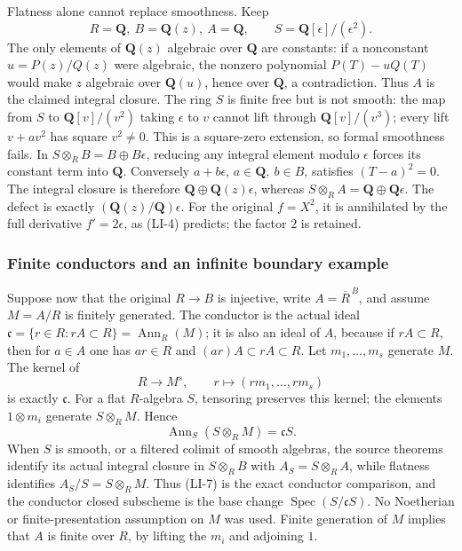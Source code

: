 Flatness alone cannot replace smoothness. Keep \[
R=\mathbf Q,\ B=\mathbf Q(z),\ A=\mathbf Q,\qquad
S=\mathbf Q[\epsilon]/(\epsilon^2).
\] The only elements of \(\mathbf Q(z)\) algebraic over \(\mathbf Q\) are constants: if a nonconstant \(u=P(z)/Q(z)\) were algebraic, the nonzero polynomial \(P(T)-uQ(T)\) would make \(z\) algebraic over \(\mathbf Q(u)\), hence over \(\mathbf Q\), a contradiction. Thus \(A\) is the claimed integral closure. The ring \(S\) is finite free but is not smooth: the map from \(S\) to \(\mathbf Q[v]/(v^2)\) taking \(\epsilon\) to \(v\) cannot lift through \(\mathbf Q[v]/(v^3)\); every lift \(v+av^2\) has square \(v^2\ne0\). This is a square-zero extension, so formal smoothness fails. In \(S\otimes_RB=B\oplus B\epsilon\), reducing any integral element modulo \(\epsilon\) forces its constant term into \(\mathbf Q\). Conversely \(a+b\epsilon\), \(a\in\mathbf Q,\ b\in B\), satisfies \((T-a)^2=0\). The integral closure is therefore \(\mathbf Q\oplus\mathbf Q(z)\epsilon\), whereas \(S\otimes_RA=\mathbf Q\oplus\mathbf Q\epsilon\). The defect is exactly \((\mathbf Q(z)/\mathbf Q)\epsilon\). For the original \(f=X^2\), it is annihilated by the full derivative \(f'=2\epsilon\), as (LI-4) predicts; the factor \(2\) is retained.

\subsubsection{Finite conductors and an infinite boundary example}\label{finite-conductors-and-an-infinite-boundary-example}

Suppose now that the original \(R\to B\) is injective, write \(A=\overline R^{\,B}\), and assume \(M=A/R\) is finitely generated. The conductor is the actual ideal \(\mathfrak c=\{r\in R:rA\subset R\}=\operatorname{Ann}_R(M)\); it is also an ideal of \(A\), because if \(rA\subset R\), then for \(a\in A\) one has \(ar\in R\) and \((ar)A\subset rA\subset R\). Let \(m_1,\ldots,m_s\) generate \(M\). The kernel of \[
R\longrightarrow M^s,\qquad r\longmapsto(rm_1,\ldots,rm_s)
\] is exactly \(\mathfrak c\). For a flat \(R\)-algebra \(S\), tensoring preserves this kernel; the elements \(1\otimes m_i\) generate \(S\otimes_RM\). Hence \[
\operatorname{Ann}_S(S\otimes_RM)=\mathfrak cS.
\tag{LI-7}
\] When \(S\) is smooth, or a filtered colimit of smooth algebras, the source theorems identify its actual integral closure in \(S\otimes_R B\) with \(A_S=S\otimes_RA\), while flatness identifies \(A_S/S=S\otimes_RM\). Thus (LI-7) is the exact conductor comparison, and the conductor closed subscheme is the base change \(\operatorname{Spec}(S/\mathfrak cS)\). No Noetherian or finite-presentation assumption on \(M\) was used. Finite generation of \(M\) implies that \(A\) is finite over \(R\), by lifting the \(m_i\) and adjoining \(1\).

